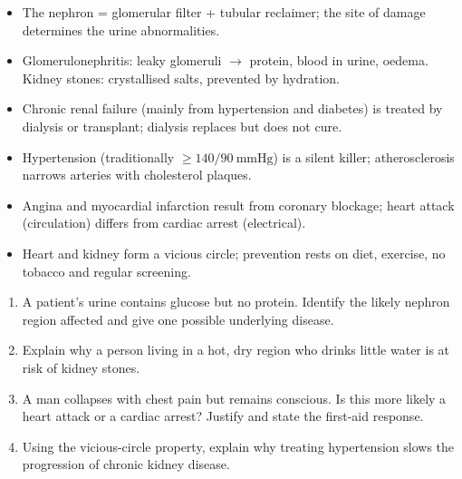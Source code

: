 \documentclass[11pt]{article}
\begin{document}
\begin{aretenir}
\begin{itemize}
\item The nephron = glomerular filter + tubular reclaimer; the site of damage determines the urine abnormalities.
\item Glomerulonephritis: leaky glomeruli $\rightarrow$ protein, blood in urine, oedema. Kidney stones: crystallised salts, prevented by hydration.
\item Chronic renal failure (mainly from hypertension and diabetes) is treated by dialysis or transplant; dialysis replaces but does not cure.
\item Hypertension (traditionally $\geq 140/90\ \mathrm{mmHg}$) is a silent killer; atherosclerosis narrows arteries with cholesterol plaques.
\item Angina and myocardial infarction result from coronary blockage; heart attack (circulation) differs from cardiac arrest (electrical).
\item Heart and kidney form a vicious circle; prevention rests on diet, exercise, no tobacco and regular screening.
\end{itemize}
\end{aretenir}

\begin{exercice}
\begin{enumerate}
\item A patient's urine contains glucose but no protein. Identify the likely nephron region affected and give one possible underlying disease.
\item Explain why a person living in a hot, dry region who drinks little water is at risk of kidney stones.
\item A man collapses with chest pain but remains conscious. Is this more likely a heart attack or a cardiac arrest? Justify and state the first-aid response.
\item Using the vicious-circle property, explain why treating hypertension slows the progression of chronic kidney disease.
\end{enumerate}
\end{exercice}
\end{document}

